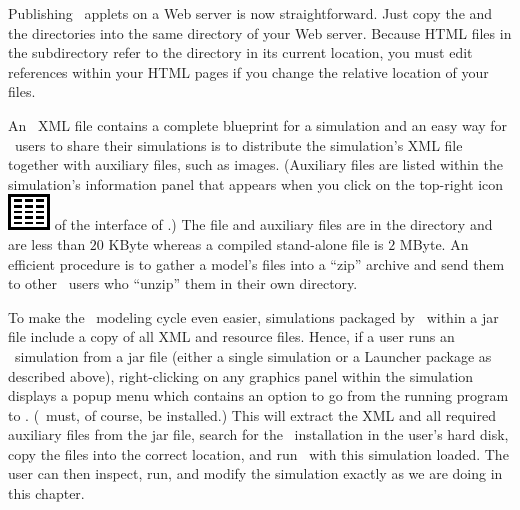 Publishing \ejs\ applets on a Web server is now straightforward. Just copy the  and the  directories into the same directory of your Web server. Because HTML files in the  subdirectory refer to the  directory in its current location, you must edit references within your HTML pages if you change the relative location of your files.

An \ejs\ XML file contains a complete blueprint for a simulation and an easy way for \ejs\ users to share their simulations is to distribute the simulation's XML file together with auxiliary files, such as images. (Auxiliary files are listed within the simulation's information panel that appears when you click on the top-right icon \includegraphics[scale=\linescale]{images/properties.eps} of the interface of \ejs.)  The  file and auxiliary files are in the  directory and are less than $20$ KByte whereas a compiled stand-alone  file is $2$ MByte.  An efficient procedure is to gather a model's files into a ``zip'' archive and send them to other \ejs\ users who ``unzip'' them in their own  directory.

To make the \ejs\ modeling cycle even easier, simulations packaged by \ejs\ within a jar file include a copy of all XML and resource files. Hence, if a user runs an \ejs\ simulation from a jar file (either a single simulation or a Launcher package as described above), right-clicking on any graphics panel within the simulation displays a popup menu which contains an option to go from the running program to \ejs. (\ejs\ must, of course, be installed.) This will extract the XML and all required auxiliary files from the jar file, search for the \ejs\ installation in the user's hard disk, copy the files into the correct location, and run \ejs\ with this simulation loaded. The user can then inspect, run, and modify the simulation exactly as we are doing in this chapter. 

